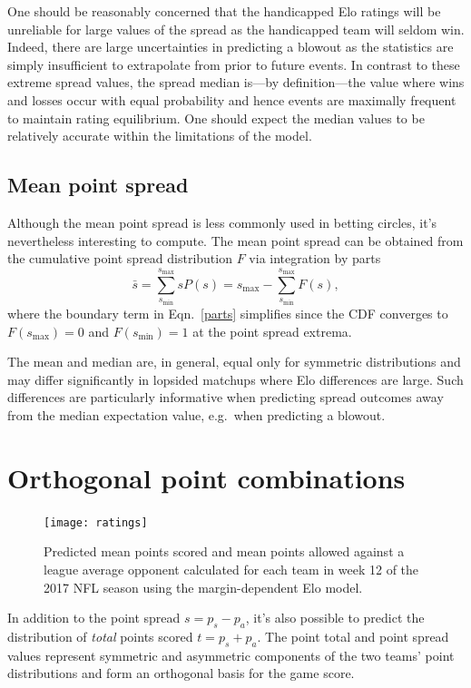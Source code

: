 \documentclass[aps,prc,reprint,amsmath,superscriptaddress]{revtex4-1}
\begin{document}
One should be reasonably concerned that the handicapped Elo ratings will be unreliable for large values of the spread as the handicapped team will seldom win.
Indeed, there are large uncertainties in predicting a blowout as the statistics are simply insufficient to extrapolate from prior to future events.
In contrast to these extreme spread values, the spread median is---by definition---the value where wins and losses occur with equal probability and hence events are maximally frequent to maintain rating equilibrium.
One should expect the median values to be relatively accurate within the limitations of the model.

\subsection{Mean point spread}

Although the mean point spread is less commonly used in betting circles, it's nevertheless interesting to compute.
The mean point spread can be obtained from the cumulative point spread distribution $F$ via integration by parts
\begin{equation}
  \label{parts}
  \bar{s} = \sum\limits_{s_\text{min}}^{s_\text{max}} s P(s) = s_\text{max} - \sum\limits_{s_\text{min}}^{s_\text{max}} F(s),
\end{equation}
where the boundary term in Eqn.~\ref{parts} simplifies since the CDF converges to $F(s_\text{max})=0$ and $F(s_\text{min})=1$ at the point spread extrema.

The mean and median are, in general, equal only for symmetric distributions and may differ significantly in lopsided matchups where Elo differences are large.
Such differences are particularly informative when predicting spread outcomes away from the median expectation value, e.g.\ when predicting a blowout. 

\section{Orthogonal point combinations}

\begin{figure}
  \texttt{[image: ratings]}
  \caption{Predicted mean points scored and mean points allowed against a league average opponent calculated for each team in week 12 of the 2017 NFL season using the margin-dependent Elo model.}
  \label{fig:ratings}
\end{figure}

In addition to the point spread $s = p_s - p_a$, it's also possible to predict the distribution of \emph{total} points scored $t = p_s + p_a$.
The point total and point spread values represent symmetric and asymmetric components of the two teams' point distributions and form an orthogonal basis for the game score. 
\end{document}
